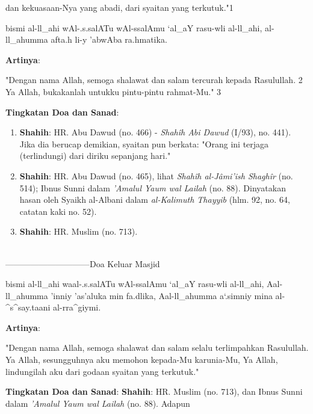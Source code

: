 \documentclass[a4paper,12pt]{article}
\begin{document}
dan kekuasaan-Nya yang abadi, dari syaitan yang terkutuk."{\scriptsize 1}\\
\begin{arabtext}
\noindent
bismi al-ll_ahi wAl-.s.salATu wAl-ssalAmu `al_aY rasu-wli al-ll_ahi, 
al-ll_ahumma afta.h li-y 'abwAba ra.hmatika.\\
\end{arabtext}
\noindent
\textbf{Artinya}:
\par
\indent
"Dengan nama Allah, semoga shalawat dan salam tercurah kepada Rasulullah.
{\scriptsize 2} Ya Allah, bukakanlah untukku pintu-pintu rahmat-Mu."
{\scriptsize 3}\\
\par
\noindent
\textbf{Tingkatan Doa dan Sanad}:
\begin{enumerate}
\item \textbf{Shahih}: HR. Abu Dawud (no. 466) - \textit{Shah\^{i}h Abi 
Dawud} (I/93), no. 441). Jika dia berucap demikian, syaitan pun berkata: 
"Orang ini terjaga (terlindungi) dari diriku sepanjang hari."
\item \textbf{Shahih}: HR. Abu Dawud (no. 465), lihat \textit{Shah\^{i}h 
al-J\^{a}mi'ish Shagh\^{i}r} (no. 514); Ibnus Sunni dalam \textit{'Amalul 
Yaum wal Lailah} (no. 88). Dinyatakan hasan oleh Syaikh al-Albani dalam 
\textit{al-Kalimuth Thayyib} (hlm. 92, no. 64, catatan kaki no. 52).
\item \textbf{Shahih}: HR. Muslim (no. 713).\\\\
\end{enumerate}
\par
{}------------------------------Doa Keluar Masjid
\begin{arabtext}
\noindent
bismi al-ll_ahi waal-.s.salATu wAl-ssalAmu `al_aY rasu-wli  al-ll_ahi, 
Aal-ll_ahumma 'inniy 'as'aluka min fa.dlika, Aal-ll_ahumma a`.simniy mina 
al-^s^say.taani al-rra^giymi.\\
\end{arabtext}
\noindent
\textbf{Artinya}:
\par
\indent
"Dengan nama Allah, semoga shalawat dan salam selalu terlimpahkan  
Rasulullah. Ya Allah, sesungguhnya aku memohon kepada-Mu karunia-Mu, Ya 
Allah, lindungilah aku dari godaan syaitan yang terkutuk."\\
\par
\noindent
\textbf{Tingkatan Doa dan Sanad}: \textbf{Shahih}: HR. Muslim (no. 713), 
dan Ibnus Sunni dalam \textit{'Amalul Yaum wal Lailah} (no. 88). Adapun 
\end{document}
